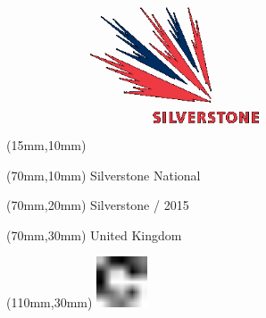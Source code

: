 \null\newpage
\begin{textblock*}{50mm}(15mm,10mm)%
\includegraphics[width=50mm]{LG/SIL.png}
\end{textblock*}
\begin{textblock*}{130mm}(70mm,10mm)%
{\fontsize{20}{20}\selectfont Silverstone National}\\
\end{textblock*}
\begin{textblock*}{120mm}(70mm,20mm)%
{\fontsize{16}{16}\selectfont Silverstone / 2015}\\
\end{textblock*}
\begin{textblock*}{120mm}(70mm,30mm)%
{\fontsize{12}{12}\selectfont United Kingdom}
\end{textblock*}
\begin{textblock*}{30mm}(110mm,30mm)%
\centering
\includegraphics[height=15mm]{icons/fa-rotate-right.pdf}
\end{textblock*}
